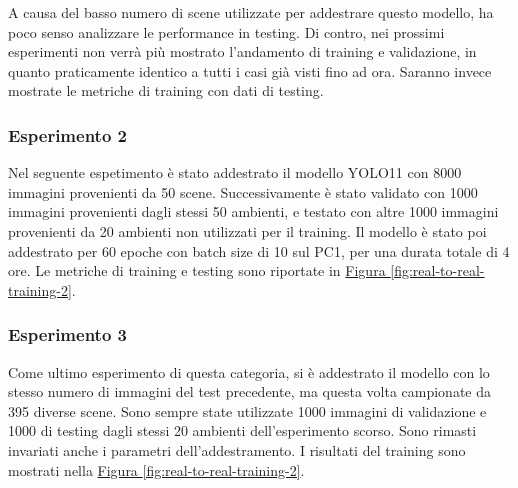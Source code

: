 \documentclass[12pt]{report}
\begin{document}
A causa del basso numero di scene utilizzate per addestrare questo modello, ha poco senso analizzare le performance in testing. Di contro, nei prossimi esperimenti non verrà più mostrato l'andamento di training e validazione, in quanto praticamente identico a tutti i casi già visti fino ad ora. Saranno invece mostrate le metriche di training con dati di testing.

\subsubsection{Esperimento 2}
\label{sec:esperimento_ds_2_2}

Nel seguente espetimento è stato addestrato il modello YOLO11 con 8000 immagini provenienti da 50 scene. Successivamente è stato validato con 1000 immagini provenienti dagli stessi 50 ambienti, e testato con altre 1000 immagini provenienti da 20 ambienti non utilizzati per il training. Il modello è stato poi addestrato per 60 epoche con batch size di 10 sul PC1, per una durata totale di 4 ore. Le metriche di training e testing sono riportate in \hyperref[fig:real-to-real-training-2]{Figura \ref{fig:real-to-real-training-2}}.



\subsubsection{Esperimento 3}
\label{sec:esperimento_ds_2_3}

Come ultimo esperimento di questa categoria, si è addestrato il modello con lo stesso numero di immagini del test precedente, ma questa volta campionate da 395 diverse scene. Sono sempre state utilizzate 1000 immagini di validazione e 1000 di testing dagli stessi 20 ambienti dell'esperimento scorso. Sono rimasti invariati anche i parametri dell'addestramento. I risultati del training sono mostrati nella \hyperref[fig:real-to-real-training-2]{Figura \ref{fig:real-to-real-training-2}}.
\end{document}
